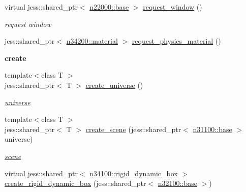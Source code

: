 \begin{DoxyCompactItemize}
virtual jess::shared\_\-ptr$<$ \hyperlink{classnebula_1_1platform_1_1window_1_1base}{n22000::base} $>$ \hyperlink{classnebula_1_1content_1_1base_a7f739b80942f64e6d095df52ad1d6d97}{request\_\-window} ()
\begin{DoxyCompactList}\small\item\em request window \item\end{DoxyCompactList}\item 
jess::shared\_\-ptr$<$ \hyperlink{classnebula_1_1content_1_1actor_1_1physics_1_1material}{n34200::material} $>$ \hyperlink{classnebula_1_1content_1_1base_a22ac169ce1f01bd3200fa7bbc611ef22}{request\_\-physics\_\-material} ()
\end{DoxyCompactItemize}
\begin{Indent}{\bf create}\par
{\em \label{_amgrp76ea0bebb3c22822b4f0dd9c9fd021c5}
 }\begin{DoxyCompactItemize}
\item 
{\footnotesize template$<$class T $>$ }\\jess::shared\_\-ptr$<$ T $>$ \hyperlink{classnebula_1_1content_1_1base_a60a8bd9bd890ae528fd3d35a48ca4ec7}{create\_\-universe} ()
\begin{DoxyCompactList}\small\item\em \hyperlink{namespacenebula_1_1content_1_1universe}{universe} \item\end{DoxyCompactList}\item 
{\footnotesize template$<$class T $>$ }\\jess::shared\_\-ptr$<$ T $>$ \hyperlink{classnebula_1_1content_1_1base_a651e5ca08e102184f1b6bc77ea4e7148}{create\_\-scene} (jess::shared\_\-ptr$<$ \hyperlink{classnebula_1_1content_1_1universe_1_1admin_1_1base}{n31100::base} $>$ universe)
\begin{DoxyCompactList}\small\item\em \hyperlink{namespacenebula_1_1content_1_1scene}{scene} \item\end{DoxyCompactList}\item 
virtual jess::shared\_\-ptr$<$ \hyperlink{classnebula_1_1content_1_1actor_1_1admin_1_1rigid__dynamic__box}{n34100::rigid\_\-dynamic\_\-box} $>$ \hyperlink{classnebula_1_1content_1_1base_a0a92b79bc3531252efed3d4f7d0d5e7b}{create\_\-rigid\_\-dynamic\_\-box} (jess::shared\_\-ptr$<$ \hyperlink{classnebula_1_1content_1_1scene_1_1admin_1_1base}{n32100::base} $>$)

\end{DoxyCompactItemize}
\end{Indent}
